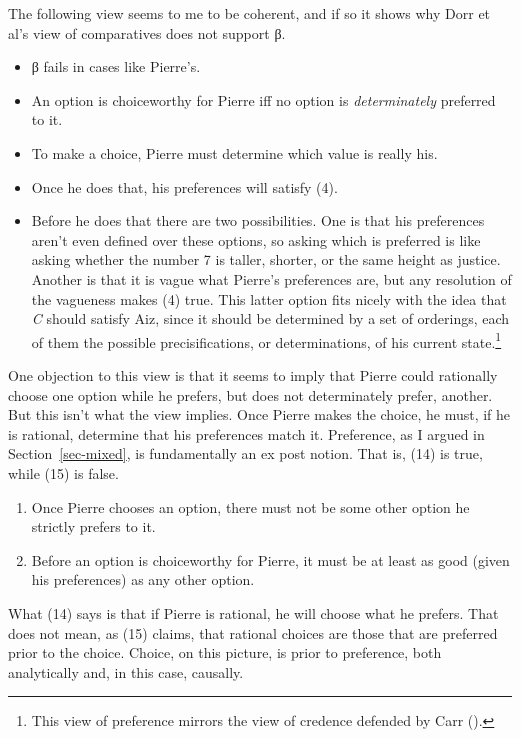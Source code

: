 \documentclass[
  11pt,
  letterpaper,
  DIV=11,
  numbers=noendperiod,
  twoside]{scrartcl}
\providecommand{\tightlist}{%
  \setlength{\itemsep}{0pt}\setlength{\parskip}{0pt}}
\begin{document}
The following view seems to me to be coherent, and if so it shows why
Dorr et al's view of comparatives does not support β.

\begin{itemize}
\tightlist
\item
  β fails in cases like Pierre's.
\item
  An option is choiceworthy for Pierre iff no option is
  \emph{determinately} preferred to it.
\item
  To make a choice, Pierre must determine which value is really his.
\item
  Once he does that, his preferences will satisfy (4).
\item
  Before he does that there are two possibilities. One is that his
  preferences aren't even defined over these options, so asking which is
  preferred is like asking whether the number 7 is taller, shorter, or
  the same height as justice. Another is that it is vague what Pierre's
  preferences are, but any resolution of the vagueness makes (4) true.
  This latter option fits nicely with the idea that \emph{C} should
  satisfy Aiz, since it should be determined by a set of orderings, each
  of them the possible precisifications, or determinations, of his
  current state.\footnote{This view of preference mirrors the view of
    credence defended by Carr ().}
\end{itemize}

One objection to this view is that it seems to imply that Pierre could
rationally choose one option while he prefers, but does not
determinately prefer, another. But this isn't what the view implies.
Once Pierre makes the choice, he must, if he is rational, determine that
his preferences match it. Preference, as I argued in
Section~\ref{sec-mixed}, is fundamentally an ex post notion. That is,
(14) is true, while (15) is false.

\begin{enumerate}
\def\labelenumi{(\arabic{enumi})}
\setcounter{enumi}{13}
\tightlist
\item
  Once Pierre chooses an option, there must not be some other option he
  strictly prefers to it.
\item
  Before an option is choiceworthy for Pierre, it must be at least as
  good (given his preferences) as any other option.
\end{enumerate}

What (14) says is that if Pierre is rational, he will choose what he
prefers. That does not mean, as (15) claims, that rational choices are
those that are preferred prior to the choice. Choice, on this picture,
is prior to preference, both analytically and, in this case, causally.
\end{document}
